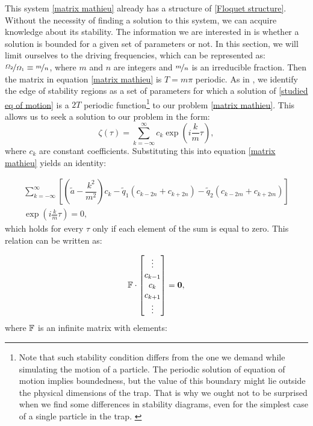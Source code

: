 This system \eqref{matrix mathieu} already has a structure of \eqref{Floquet structure}. Without the necessity of finding a solution to this system, we can acquire knowledge about its stability. The information we are interested in is whether a solution is bounded for a given set of parameters or not. In this section, we will limit ourselves to the driving frequencies, which can be represented as: $\nicefrac{\Omega_2}{\Omega_1} \equiv \nicefrac{m}{n}$, where $m$ and $n$ are integers and $\nicefrac{m}{n}$ is an irreducible fraction. Then the matrix in equation \eqref{matrix mathieu} is $T = m \pi$ periodic. As in \cite{leefer2017investigation}, we identify the edge of stability regions as a set of parameters for which a solution of \eqref{studied eq of motion} is a $2T$ periodic function\footnote{Note that such stability condition differs from the one we demand while simulating the motion of a particle. The periodic solution of equation of motion implies boundedness, but the value of this boundary might lie outside the physical dimensions of the trap. That is why we ought not to be surprised when we find some differences in stability diagrams, even for the simplest case of a single particle in the trap. \label{foot:different stability condition}} to our problem \eqref{matrix mathieu}. This allows us to seek a solution to our problem in the form:
\begin{equation}
	\label{Floquet ansatz}
	\zeta(\tau) = \sum_{k=-\infty}^{\infty} c_k \exp(i\frac{k}{m}\tau),
\end{equation}
where $c_k$ are constant coefficients. Substituting this into equation \eqref{matrix mathieu} yields an identity:

\begin{multline}
	\sum_{k=\minus\infty}^{\infty}\left[ \left(\tilde{a} \minus \dfrac{k^2}{m^2} \right)c_k \minus \tilde{q}_1 \left(c_{k-2n} + c_{k+2n} \right) \minus \tilde{q}_2 \left(c_{k-2m} + c_{k+2m} \right)  \right] \\ \exp(i\frac{k}{m}\tau) = 0,
\end{multline}
which holds for every $\tau$ only if each element of the sum is equal to zero. This relation can be written as:

\begin{equation}
	\label{Floquet edge eq}
	\mathbb{F} \cdot \begin{bmatrix}
	\vdots \\
	c_{k-1} \\
	c_{k} \\
	c_{k+1} \\
	\vdots
	\end{bmatrix} = \vb{0},
\end{equation}
where $\mathbb{F}$ is an infinite matrix with elements:

